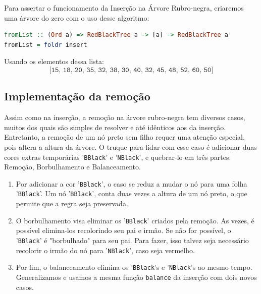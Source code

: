 Para assertar o funcionamento da Inserção na Árvore Rubro-negra, criaremos uma árvore do zero com o uso desse algoritmo:

\begin{lstlisting}[language=haskell]
fromList :: (Ord a) => RedBlackTree a -> [a] -> RedBlackTree a
fromList = foldr insert
\end{lstlisting}
\FloatBarrier

\noindent
Usando os elementos dessa lista:
$$
	\texttt{[15, 18, 20, 35, 32, 38, 30, 40, 32, 45, 48, 52, 60, 50]}
$$
\begin{figure}[!ht]
	\centering
\end{figure}
\FloatBarrier

\subsection{Implementação da remoção}

Assim como na inserção, a remoção na árvore rubro-negra tem diversos casos, muitos dos quais são simples de resolver e até idênticos aos da inserção. Entretanto, a remoção de um nó preto sem filho requer uma atenção especial, pois altera a altura da árvore. O truque para lidar com esse caso é adicionar duas cores extras temporárias '\texttt{BBlack}' e '\texttt{NBlack}', e quebrar-lo em três partes: Remoção, Borbulhamento e Balanceamento.


\begin{enumerate}
	\item Por adicionar a cor '\texttt{BBlack}', o caso se reduz a mudar o nó para uma folha '\texttt{BBlack}'. Um nó '\texttt{BBlack}', conta duas vezes a altura de um nó preto, o que permite que a regra seja preservada.
	\item O borbulhamento visa eliminar os '\texttt{BBlack}' criados pela remoção. As vezes, é possível elimina-los recolorindo seu pai e irmão. Se não for possível, o '\texttt{BBlack}' é  "borbulhado" para seu pai. Para fazer, isso talvez seja necessário recolorir o irmão do nó para '\texttt{NBlack}', caso seja vermelho.
	\item Por fim, o balanceamento elimina os '\texttt{BBlack}'s e '\texttt{NBlack}'s ao mesmo tempo. Generalizamos e usamos a mesma função \texttt{balance} da inserção com dois novos casos.
\end{enumerate}

